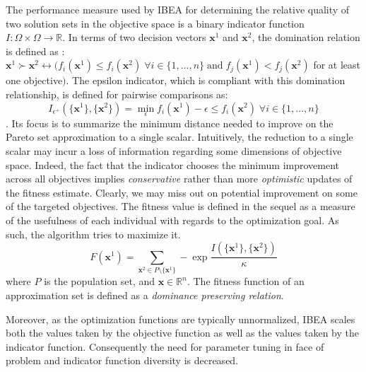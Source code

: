 \documentclass{sig-alternate}
\begin{document}
The performance measure used by IBEA for determining the relative quality of two solution sets in the objective space is a binary indicator function $I: \Omega \times \Omega \rightarrow \mathbb{R}$. 
In terms of two decision vectors $\bm{x}^1$ and $\bm{x}^2$,  the domination relation is defined as : $\bm{x}^1 \succ \bm{x}^2 \leftrightarrow ( f_i(\bm{x}^1) \leq f_i(\bm{x}^2) \; \forall i \in \{1, ..., n\} \;\text{and}\; f_j(\bm{x}^1) < f_j(\bm{x}^2)$ for at least one objective$)$. 
The epsilon indicator, which is compliant with this domination relationship, is defined for pairwise comparisons as: $$I_{\epsilon^+} (\{\bm{x}^1\}, \{\bm{x}^2\}) = \min_\epsilon f_i(\bm{x}^1) - \epsilon \leq f_i(\bm{x}^2) \; \forall i \in \{1, ..., n\}$$. 
Its focus is to summarize the minimum distance needed to improve on the Pareto set approximation to a single scalar. 
Intuitively, the reduction to a single scalar may incur a  loss of information regarding some dimensions of objective space. Indeed, the fact that the indicator chooses the minimum improvement across all objectives implies \emph{conservative} rather than more \emph{optimistic} updates of the fitness estimate. Clearly, we may miss out on potential improvement on some of the targeted objectives. The fitness value is defined in the sequel as a measure of the usefulness of each individual with regards to the optimization goal. As such, the algorithm tries to maximize it.
$$ F(\bm{x}^1) = \sum_{\bm{x}^2 \in P \setminus \{\bm{x}^1\}} - \exp{\frac{I(\{\bm{x}^1\}, \{\bm{x}^2\})}{\kappa}}$$ where $P$ is the population set, and $\bm{x} \in \mathbb{R}^n$. The fitness function of an approximation set is defined as a \emph{dominance preserving relation}.

Moreover, as the optimization functions are typically unnormalized, IBEA scales both the values taken by the objective function as well as the values taken by the indicator function. Consequently the need for parameter tuning in face of problem and indicator function diversity is decreased.
\end{document}
